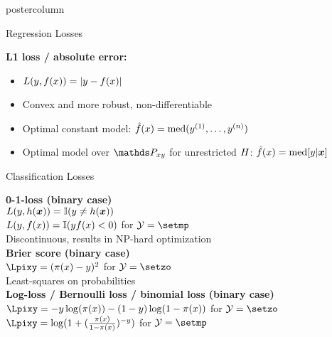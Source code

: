 \documentclass{beamer}
\begin{document}
\begin{frame}[fragile]{}
\begin{columns}
\begin{column}{.31\textwidth}
\begin{beamercolorbox}[center]{postercolumn}
\begin{minipage}{.98\textwidth}
{\begin{myblock}{Regression Losses}
\vspace*{1ex}


  \textbf{L1 loss / absolute error:} 
\begin{itemize}
\setlength{\itemindent}{+.3in}
  \item $L(y, f(x)) = |y-f(x)|$
  \item Convex and more robust, non-differentiable
  \item Optimal constant model: $\hat{f}(x) = \text{med}(y^{(1)}, \ldots, y^{(n)})$
  \item Optimal model over $\Pxy$ for unrestricted $H$: $\hat{f}(x) = \text{med} [y | \bm{x}]$
\end{itemize}
\end{myblock}


\begin{myblock}{Classification Losses}

\textbf{0-1-loss (binary case)}\\
$L (y, h(\bm{x})) = \mathbb{I}(y \neq h(\bm{x}))$\\
$L (y, f(x)) = \mathbb{I}( yf(x) < 0)$ for $\Yspace = \setmp$ \\ 
Discontinuous, results in NP-hard optimization\\

\textbf{Brier score (binary case)} \\
$\Lpixy = (\pix - y)^2$ for $\Yspace = \setzo$ \\
Least-squares on probabilities\\


\textbf{Log-loss / Bernoulli loss / binomial loss (binary case)}\\
$\Lpixy = -y \log(\pix) - (1-y) \log(1-\pix)$ for $\Yspace = \setzo$ \\
$\Lpixy = \log(1 + (\frac{\pix}{1-\pix})^{-y})$ for $\Yspace = \setmp$ \\


\end{myblock}}
\end{minipage}
\end{beamercolorbox}
\end{column}
\end{columns}
\end{frame}
\end{document}
